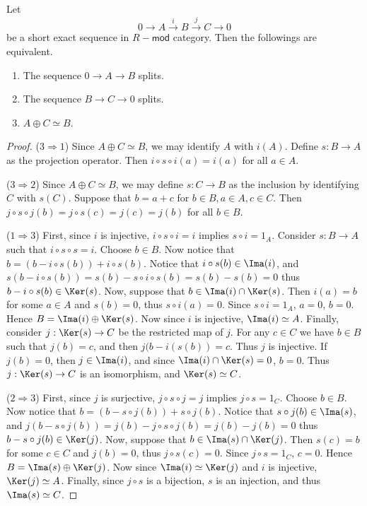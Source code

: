 \begin{lemma} Let
\begin{equation}
0\rightarrow A\xrightarrow{i} B\xrightarrow{j} C\rightarrow 0
\end{equation}
be a short exact sequence in $R-\mathsf{mod}$ category. Then the followings are equivalent.
\begin{enumerate}
\item The sequence $0\rightarrow A\rightarrow B$ splits.
\item The sequence $B\rightarrow C\rightarrow 0$ splits.
\item $A\oplus C\simeq B$.
\end{enumerate}
\end{lemma}
\begin{proof}
($3\Rightarrow 1$) Since $A\oplus C\simeq B$, we may identify $A$ with $i(A)$. Define $s:B\rightarrow A$ as the projection operator. Then $i\circ s\circ i(a)=i(a)$ for all $a\in A$.

($3\Rightarrow 2$) Since $A\oplus C\simeq B$, we may define $s:C\rightarrow B$ as the inclusion by identifying $C$ with $s(C)$. Suppose that $b=a+c$ for $b\in B, a\in A, c\in C$. Then $j\circ s\circ j(b)=j\circ s(c)=j(c)=j(b)$ for all $b\in B$.

($1\Rightarrow 3$) First, since $i$ is injective, $i\circ s\circ i=i$ implies $s\circ i=1_A$. Consider $s:B\rightarrow A$ such that $i\circ s\circ s=i$. Choose $b\in B$. Now notice that $b=(b-i\circ s(b))+i\circ s(b)$. Notice that $i\circ s(b)\in \Ima(i)$, and $s(b-i\circ s(b))=s(b)-s\circ i\circ s(b)=s(b)-s(b)=0$ thus $b-i\circ s(b)\in \Ker(s)$. Now, suppose that $b\in \Ima(i)\cap \Ker(s)$. Then $i(a)=b$ for some $a\in A$ and $s(b)=0$, thus $s\circ i(a)=0$. Since $s\circ i=1_A$, $a=0$, $b=0$. Hence $B=\Ima(i)\oplus \Ker(s)$. Now since $i$ is injective, $\Ima(i)\simeq A$. Finally, consider $j:\Ker(s)\rightarrow C$ be the restricted map of $j$. For any $c\in C$ we have $b\in B$ such that $j(b)=c$, and then $j(b-i(s(b))=c$. Thus $j$ is injective. If $j(b)=0$, then $j\in \Ima(i)$, and since $\Ima(i)\cap \Ker(s)=0$, $b=0$. Thus $j:\Ker(s)\rightarrow C$ is an isomorphism, and $\Ker(s)\simeq C$.

($2\Rightarrow 3$) First, since $j$ is surjective, $j\circ s\circ j=j$ implies $j\circ s=1_C$. Choose $b\in B$. Now notice that $b=(b-s\circ j(b))+s\circ j(b)$. Notice that $s\circ j(b)\in \Ima(s)$, and $j(b-s\circ j(b))=j(b)-j\circ s\circ j(b)=j(b)-j(b)=0$ thus $b-s\circ j(b)\in \Ker(j)$. Now, suppose that $b\in \Ima(s)\cap \Ker(j)$. Then $s(c)=b$ for some $c\in C$ and $j(b)=0$, thus $j\circ s(c)=0$. Since $j\circ s=1_C$, $c=0$. Hence $B=\Ima(s)\oplus \Ker(j)$. Now since $\Ima(i)\simeq \Ker(j)$ and $i$ is injective, $\Ker(j)\simeq A$. Finally, since $j\circ s$ is a bijection, $s$ is an injection, and thus $\Ima(s)\simeq C$.
\end{proof}

